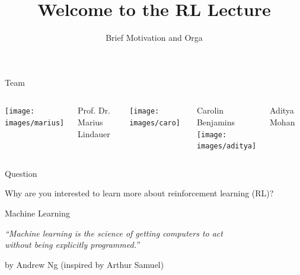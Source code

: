 \documentclass[aspectratio=169]{../latex_main/tntbeamer}  %
\title[ML-RL: Big Picture]{Welcome to the RL Lecture}
\subtitle{Brief Motivation and Orga}
\begin{document}
	
	\maketitle

\begin{frame}[c]{Team}
	
	\begin{columns}[T]
		
		\centering
		\texttt{[image: images/marius]}
		
		Prof. Dr.\\ Marius Lindauer
		
		\centering
		\texttt{[image: images/caro]}
		
		Carolin Benjamins\\
		
		\centering
		\texttt{[image: images/aditya]}
		
		Aditya Mohan \\
		
		
		
		
	\end{columns}
	
	
\end{frame}
\begin{frame}[c]{Question}
	
	\centering
	{
	\huge
	Why are you interested to learn more about reinforcement learning (RL)?
	}

	
\end{frame}
\begin{frame}[c]{Machine Learning}

\centering
\textit{``Machine learning is the science of getting computers to act\\
 without being explicitly programmed.''}

\hfill by Andrew Ng (inspired by Arthur Samuel)

\end{frame}
\end{document}
